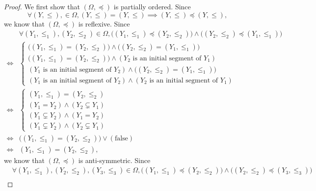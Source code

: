 \begin{proof}
    We first show that \((\Omega, \preceq)\) is partially ordered.
    Since
    \[
        \forall (Y, \leq), \in \Omega, (Y, \leq) = (Y, \leq) \implies (Y, \leq) \preceq (Y, \leq),
    \]
    we know that \((\Omega, \preceq)\) is reflexive.
    Since
    \begin{align*}
             & \forall (Y_1, \leq_1), (Y_2, \leq_2) \in \Omega, \big((Y_1, \leq_1) \preceq (Y_2, \leq_2)\big) \land \big((Y_2, \leq_2) \preceq (Y_1, \leq_1)\big) \\
        \iff & \begin{cases}
                   \big((Y_1, \leq_1) = (Y_2, \leq_2)\big) \land \big((Y_2, \leq_2) = (Y_1, \leq_1)\big)     \\
                   \big((Y_1, \leq_1) = (Y_2, \leq_2)\big) \land (Y_2 \text{ is an initial segment of } Y_1) \\
                   (Y_1 \text{ is an initial segment of } Y_2) \land \big((Y_2, \leq_2) = (Y_1, \leq_1)\big) \\
                   (Y_1 \text{ is an initial segment of } Y_2) \land (Y_2 \text{ is an initial segment of } Y_1)
               \end{cases}                                                       \\
        \iff & \begin{cases}
                   (Y_1, \leq_1) = (Y_2, \leq_2)          \\
                   (Y_1 = Y_2) \land (Y_2 \subsetneq Y_1) \\
                   (Y_1 \subsetneq Y_2) \land (Y_1 = Y_2) \\
                   (Y_1 \subsetneq Y_2) \land (Y_2 \subsetneq Y_1)
               \end{cases}                                                                                                     \\
        \iff & \big((Y_1, \leq_1) = (Y_2, \leq_2)\big) \lor (\text{false})                                                                                        \\
        \iff & (Y_1, \leq_1) = (Y_2, \leq_2),
    \end{align*}
    we know that \((\Omega, \preceq)\) is anti-symmetric.
    Since
    \begin{align*}
             & \forall (Y_1, \leq_1), (Y_2, \leq_2), (Y_3, \leq_3) \in \Omega, \big((Y_1, \leq_1) \preceq (Y_2, \leq_2)\big) \land \big((Y_2, \leq_2) \preceq (Y_3, \leq_3)\big) \\

\end{align*}
\end{proof}
